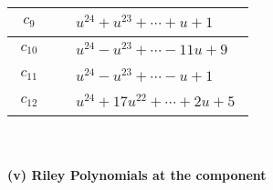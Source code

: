 \documentclass[1p]{elsarticle_modified}
\theoremstyle{definition}
\begin{document}
\begin{tabular}{m{50pt}|m{274pt}}
\hline $$\begin{aligned}c_{9}\end{aligned}$$&$\begin{aligned}
&u^{24}+u^{23}+\cdots+u+1
\end{aligned}$\\
\hline $$\begin{aligned}c_{10}\end{aligned}$$&$\begin{aligned}
&u^{24}- u^{23}+\cdots-11 u+9
\end{aligned}$\\
\hline $$\begin{aligned}c_{11}\end{aligned}$$&$\begin{aligned}
&u^{24}- u^{23}+\cdots- u+1
\end{aligned}$\\
\hline $$\begin{aligned}c_{12}\end{aligned}$$&$\begin{aligned}
&u^{24}+17 u^{22}+\cdots+2 u+5
\end{aligned}$\\
\hline
\end{tabular}\\~\\
\newpage\renewcommand{\arraystretch}{1}
\flushleft \textbf{(v) Riley Polynomials at the component}\newline \\
\end{document}
